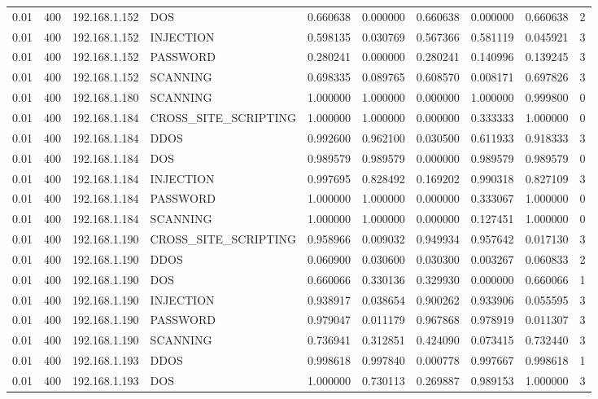 \begin{tabular}{llllllllll}
0.01 & 400 & 192.168.1.152 & DOS & 0.660638 & 0.000000 & 0.660638 & 0.000000 & 0.660638 & 2 \\
0.01 & 400 & 192.168.1.152 & INJECTION & 0.598135 & 0.030769 & 0.567366 & 0.581119 & 0.045921 & 3 \\
0.01 & 400 & 192.168.1.152 & PASSWORD & 0.280241 & 0.000000 & 0.280241 & 0.140996 & 0.139245 & 3 \\
0.01 & 400 & 192.168.1.152 & SCANNING & 0.698335 & 0.089765 & 0.608570 & 0.008171 & 0.697826 & 3 \\
0.01 & 400 & 192.168.1.180 & SCANNING & 1.000000 & 1.000000 & 0.000000 & 1.000000 & 0.999800 & 0 \\
0.01 & 400 & 192.168.1.184 & CROSS\_SITE\_SCRIPTING & 1.000000 & 1.000000 & 0.000000 & 0.333333 & 1.000000 & 0 \\
0.01 & 400 & 192.168.1.184 & DDOS & 0.992600 & 0.962100 & 0.030500 & 0.611933 & 0.918333 & 3 \\
0.01 & 400 & 192.168.1.184 & DOS & 0.989579 & 0.989579 & 0.000000 & 0.989579 & 0.989579 & 0 \\
0.01 & 400 & 192.168.1.184 & INJECTION & 0.997695 & 0.828492 & 0.169202 & 0.990318 & 0.827109 & 3 \\
0.01 & 400 & 192.168.1.184 & PASSWORD & 1.000000 & 1.000000 & 0.000000 & 0.333067 & 1.000000 & 0 \\
0.01 & 400 & 192.168.1.184 & SCANNING & 1.000000 & 1.000000 & 0.000000 & 0.127451 & 1.000000 & 0 \\
0.01 & 400 & 192.168.1.190 & CROSS\_SITE\_SCRIPTING & 0.958966 & 0.009032 & 0.949934 & 0.957642 & 0.017130 & 3 \\
0.01 & 400 & 192.168.1.190 & DDOS & 0.060900 & 0.030600 & 0.030300 & 0.003267 & 0.060833 & 2 \\
0.01 & 400 & 192.168.1.190 & DOS & 0.660066 & 0.330136 & 0.329930 & 0.000000 & 0.660066 & 1 \\
0.01 & 400 & 192.168.1.190 & INJECTION & 0.938917 & 0.038654 & 0.900262 & 0.933906 & 0.055595 & 3 \\
0.01 & 400 & 192.168.1.190 & PASSWORD & 0.979047 & 0.011179 & 0.967868 & 0.978919 & 0.011307 & 3 \\
0.01 & 400 & 192.168.1.190 & SCANNING & 0.736941 & 0.312851 & 0.424090 & 0.073415 & 0.732440 & 3 \\
0.01 & 400 & 192.168.1.193 & DDOS & 0.998618 & 0.997840 & 0.000778 & 0.997667 & 0.998618 & 1 \\
0.01 & 400 & 192.168.1.193 & DOS & 1.000000 & 0.730113 & 0.269887 & 0.989153 & 1.000000 & 3 \\

\end{tabular}
